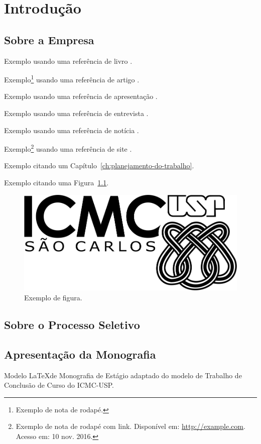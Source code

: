 \chapter{Introdução}
\label{ch:introducao}

\section{Sobre a Empresa}

Exemplo usando uma referência de livro \cite{bib:livro-nome}.

Exemplo\footnote{Exemplo de nota de rodapé.} usando uma referência de artigo \cite{bib:artigo-nome}.

Exemplo usando uma referência de apresentação \cite{bib:artigo-nome}.

Exemplo usando uma referência de entrevista \cite{bib:entrevista-nome}.

Exemplo usando uma referência de notícia \cite{bib:noticia-nome}.

Exemplo\footnote{Exemplo de nota de rodapé com link. Disponível em: \url{http://example.com}. Acesso em: 10 nov. 2016.} usando uma referência de site \cite{bib:site-nome}.

Exemplo citando um Capítulo~\ref{ch:planejamento-do-trabalho}.

Exemplo citando uma Figura~\ref{fig:figura-nome}.

\begin{figure}[h!]
	\centering
	\includegraphics[scale=0.15]{./images/logo-capa.png}
	\caption{Exemplo de figura. \label{fig:figura-nome}}
\end{figure}

\section{Sobre o Processo Seletivo}



\section{Apresentação da Monografia}

Modelo \LaTeX de Monografia de Estágio adaptado do modelo de Trabalho de Conclusão de Curso do ICMC-USP.

